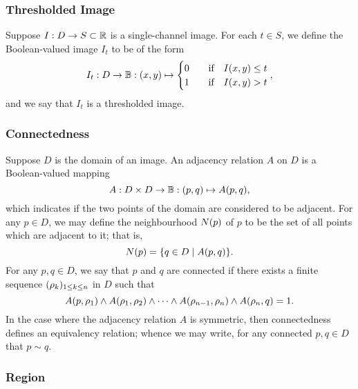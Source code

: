 \documentclass[draft]{article}
\begin{document}
\subsubsection*{Thresholded Image}

Suppose $I : D \to S \subset \mathbb{R}$ is a single-channel image.
For each $t \in S$, we define the Boolean-valued image $I_{t}$ to be of the
form
\begin{equation}
  \label{eq:def-image-threshold}
  I_{t}
  :
  D \to \mathbb{B}
  :
  \lr{x, y}
  \mapsto
  \begin{cases}
    0
    &\qq{if}
    I\lr{x, y} \leq t
    \\
    1
    &\qq{if}
    I\lr{x, y} > t
  \end{cases}
  ,
\end{equation}
and we say that $I_{t}$ is a thresholded image.

\subsubsection*{Connectedness}

Suppose $D$ is the domain of an image.
An adjacency relation $A$ on $D$ is a Boolean-valued mapping
\begin{equation}
  \label{eq:def-adjacency}
  A
  :
  D \times D \to \mathbb{B}
  :
  (p, q)
  \mapsto
  A(p, q)
  ,
\end{equation}
which indicates if the two points of the domain are considered to be adjacent.
For any $p \in D$, we may define the neighbourhood $N(p)$ of $p$ to be the
set of all points which are adjacent to it; that is,
\begin{equation}
  \label{eq:def-neighbourhood}
  N(p)
  =
  \lbrace
    q \in D
    \mid
    A(p, q)
  \rbrace
  .
\end{equation}
For any $p, q \in D$, we say that $p$ and $q$ are connected if there exists a
finite sequence $(\rho_{k})_{1 \leq k \leq n}$ in $D$ such that
\begin{equation}
  \label{eq:def-connected}
  A(p, \rho_{1})
  \wedge
  A(\rho_{1}, \rho_{2})
  \wedge
  \dotsb
  \wedge
  A(\rho_{n-1}, \rho_{n})
  \wedge
  A(\rho_{n}, q)
  =
  1
  .
\end{equation}
In the case where the adjacency relation $A$ is symmetric, then connectedness
defines an equivalency relation; whence we may write, for any connected
$p, q \in D$ that $p \sim q$.

\subsubsection*{Region}
\end{document}
